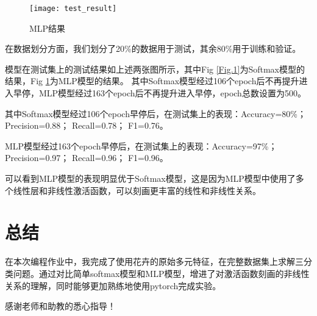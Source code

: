 \documentclass[lang=cn,a4paper]{elegantpaper}
\begin{document}
\begin{figure}[H]
  \centering
  \texttt{[image: test\_result]}
  \caption{MLP结果} 
  \label{Fig.2}
\end{figure}

在数据划分方面，我们划分了20\%的数据用于测试，其余80\%用于训练和验证。

模型在测试集上的测试结果如上述两张图所示，其中Fig \ref{Fig.1}为Softmax模型的结果，Fig \ref{Fig.2}为MLP模型的结果。
其中Softmax模型经过106个epoch后不再提升进入早停，MLP模型经过163个epoch后不再提升进入早停，epoch总数设置为500。

其中Softmax模型经过106个epoch早停后，在测试集上的表现：Accuracy=80\%； Precision=0.88； Recall=0.78； F1=0.76。

MLP模型经过163个epoch早停后，在测试集上的表现：Accuracy=97\%； Precision=0.97； Recall=0.96； F1=0.96。

可以看到MLP模型的表现明显优于Softmax模型，这是因为MLP模型中使用了多个线性层和非线性激活函数，可以刻画更丰富的线性和非线性关系。

\section{总结}

在本次编程作业中，我完成了使用花卉的原始多元特征，在完整数据集上求解三分类问题。通过对比简单softmax模型和MLP模型，增进了对激活函数刻画的非线性关系的理解，同时能够更加熟练地使用pytorch完成实验。

感谢老师和助教的悉心指导！

\nocite{*}
\printbibliography[heading=bibintoc, title=\ebibname]

\appendix
\addappheadtotoc
\end{document}
